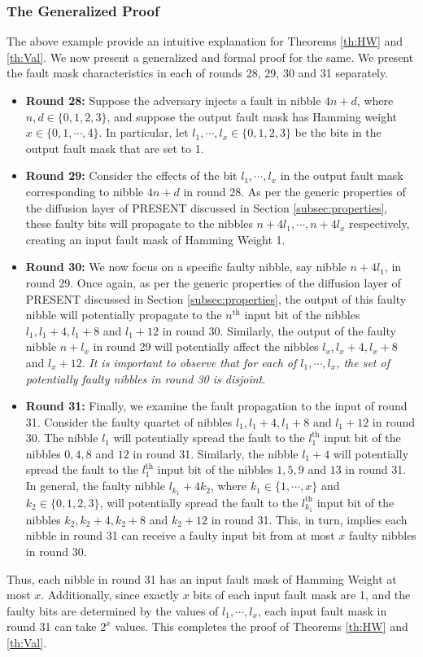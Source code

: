 \documentclass[10pt, conference, compsocconf]{IEEEtran}  %
\numberwithin{Definition}{section}
\numberwithin{Claim}{section}
\begin{document}
\subsubsection{\textbf{The Generalized Proof}} The above example provide an intuitive explanation for Theorems \ref{th:HW} and \ref{th:Val}. We now present a generalized and formal proof for the same. We present the fault mask characteristics in each of rounds 28, 29, 30 and 31 separately.
\begin{itemize}
\item\textbf{Round 28:} Suppose the adversary injects a fault in nibble $4n+d$, where $n,d\in\{0,1,2,3\}$, and suppose the output fault mask has Hamming weight $x\in\{0,1,\cdots,4\}$. In particular, let $l_1,\cdots,l_{x}\in\{0,1,2,3\}$ be the bits in the output fault mask that are set to 1.
\item\textbf{Round 29:} Consider the effects of the bit $l_1,\cdots,l_x$ in the output fault mask corresponding to nibble $4n+d$ in round 28. As per the generic properties of the diffusion layer of PRESENT discussed in Section \ref{subsec:properties}, these faulty bits will propagate to the nibbles $n+4l_1,\cdots,n+4l_x$ respectively, creating an input fault mask of Hamming Weight 1.

\item \textbf{Round 30:} We now focus on a specific faulty nibble, say nibble $n+4l_1$, in round 29. Once again, as per the generic properties of the diffusion layer of PRESENT discussed in Section \ref{subsec:properties}, the output of this faulty nibble will potentially propagate to the $n^{\text{th}}$ input bit of the nibbles $l_1, l_1+4, l_1+8$ and $l_1+12$ in round 30. Similarly, the output of the faulty nibble $n+l_x$ in round 29 will potentially affect the nibbles $l_x, l_x+4,l_x+8$ and $l_x+12$. \emph{It is important to observe that for each of $l_1,\cdots,l_x$, the set of potentially faulty nibbles in round 30 is disjoint}.

\item \textbf{Round 31:} Finally, we examine the fault propagation to the input of round 31. Consider the faulty quartet of nibbles $l_1, l_1+4, l_1+8$ and $l_1+12$ in round 30. The nibble $l_1$ will potentially spread the fault to the $l^{\text{th}}_1$ input bit of the nibbles $0,4, 8$ and $12$ in round 31. Similarly, the nibble $l_1+4$ will potentially spread the fault to the $l^{\text{th}}_1$ input bit of the nibbles $1,5, 9$ and $13$ in round 31. In general, the faulty nibble $l_{k_1}+4k_2$, where $k_1\in\{1,\cdots,x\}$ and $k_2\in\{0,1,2,3\}$, will potentially spread the fault to the $l^{\text{th}}_{k_1}$ input bit of the nibbles $k_2,k_2+4, k_2+8$ and $k_2+12$ in round 31. This, in turn, implies each nibble in round 31 can receive a faulty input bit from at most $x$ faulty nibbles in round 30. 
\end{itemize}
\noindent Thus, each nibble in round 31 has an input fault mask of Hamming Weight at most $x$. Additionally, since exactly $x$ bits of each input fault mask are 1, and the faulty bits are determined by the values of $l_1,\cdots,l_x$, each input fault mask in round 31 can take $2^x$ values. This completes the proof of Theorems \ref{th:HW} and \ref{th:Val}. 
\end{document}
